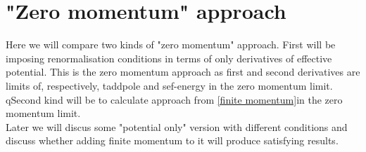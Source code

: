 \section{"Zero momentum" approach}
Here we will compare two kinds of "zero momentum" approach. 
First will be imposing renormalisation conditions in terms of only derivatives of 
effective potential. This is the zero momentum approach as first and second derivatives 
are limits of, respectively, taddpole and sef-energy in the zero momentum limit. \\
qSecond kind will be to calculate approach from \ref{finite momentum}in the zero momentum limit.\\
Later we will discus some "potential only" version with different conditions and discuss whether 
adding finite momentum to it will produce satisfying results.  

